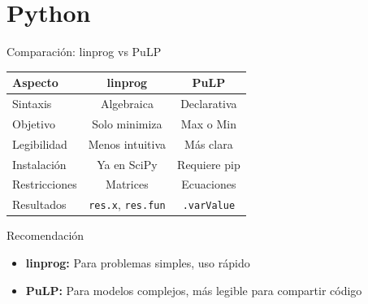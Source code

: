 \documentclass[aspectratio=169,10pt]{beamer}
\begin{document}
\section{Python}

\begin{frame}{Comparación: linprog vs PuLP}

\begin{center}
\begin{tabular}{lcc}
\toprule
\textbf{Aspecto} & \textbf{linprog} & \textbf{PuLP} \\
\midrule
Sintaxis & Algebraica & Declarativa \\
Objetivo & Solo minimiza & Max o Min \\
Legibilidad & Menos intuitiva & Más clara \\
Instalación & Ya en SciPy & Requiere pip \\
Restricciones & Matrices & Ecuaciones \\
Resultados & \texttt{res.x}, \texttt{res.fun} & \texttt{.varValue} \\
\bottomrule
\end{tabular}
\end{center}

\vspace{0.5cm}

\begin{alertblock}{Recomendación}
\begin{itemize}
    \item \textbf{linprog:} Para problemas simples, uso rápido
    \item \textbf{PuLP:} Para modelos complejos, más legible para compartir código
\end{itemize}
\end{alertblock}

\end{frame}
\end{document}
